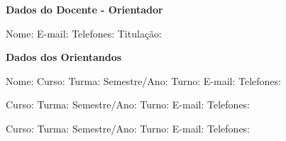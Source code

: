 \documentclass[12pt, a4paper]{article}
\begin{document}
\begin{center}
  \Large
  \textbf{Dados do Docente - Orientador}
\end{center}
Nome: \underline{\hspace{14.5cm}}
E-mail: \underline{\hspace{14.5cm}}
Telefones: \underline{\hspace{14cm}}
Titulação: \underline{\hspace{14cm}}

\vspace{1cm}

\begin{center}
  \Large
  \textbf{Dados dos Orientandos}
\end{center}
Nome: \underline{\hspace{14.5cm}}
Curso: \underline{\hspace{14.5cm}}
Turma: \underline{\hspace{3cm}} Semestre/Ano: \underline{\hspace{3cm}} Turno:
\underline{\hspace{3.5cm}}
E-mail: \underline{\hspace{14.5cm}}
Telefones: \underline{\hspace{14cm}}

\vspace{0.5cm}

 \underline{\hspace{14.5cm}}
Curso: \underline{\hspace{14.5cm}}
Turma: \underline{\hspace{3cm}} Semestre/Ano: \underline{\hspace{3cm}} Turno:
\underline{\hspace{3.5cm}}
E-mail: \underline{\hspace{14.5cm}}
Telefones: \underline{\hspace{14cm}}

\vspace{0.5cm}

 \underline{\hspace{14.5cm}}
Curso: \underline{\hspace{14.5cm}}
Turma: \underline{\hspace{3cm}} Semestre/Ano: \underline{\hspace{3cm}} Turno:
\underline{\hspace{3.5cm}}
E-mail: \underline{\hspace{14.5cm}}
Telefones: \underline{\hspace{14cm}}
\end{document}
